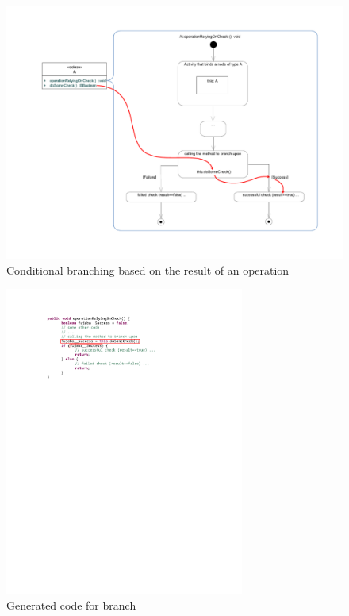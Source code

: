 \begin{figure}[htbp]
\begin{center}
  \includegraphics[width=1\textwidth]{pics/advancedTopics/branching/SDM_with_branch}
  \caption{Conditional branching based on the result of an operation}
  \label{fig:cond_branch_on_op}
\end{center}
\end{figure}

\begin{figure}[htbp]
\begin{center}
  \includegraphics[width=0.7\textwidth]{pics/advancedTopics/branching/generated_code}
  \caption{Generated code for branch}
  \label{fig:cond_branch_on_op_code}
\end{center}
\end{figure}

